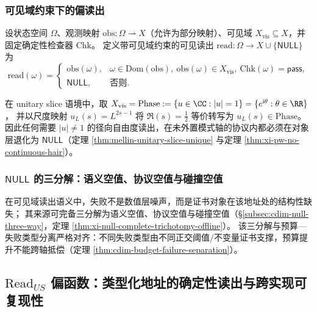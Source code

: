 \subsubsection{可见域约束下的偏读出}
\begin{definition}[可见域约束下的偏读出]\label{def:cdim-visible-domain-read}
设状态空间 \(\Omega\)、观测映射 \(\mathrm{obs}:\Omega\rightharpoonup X\)（允许为部分映射）、可见域 \(X_{\mathrm{vis}}\subseteq X\)，并固定确定性检查器 \(\mathrm{Chk}\)。
定义带可见域约束的可见读出 \(\mathrm{read}:\Omega\to X\cup\{\mathsf{NULL}\}\) 为
\[
\mathrm{read}(\omega)=
\begin{cases}
\mathrm{obs}(\omega), & \omega\in\mathrm{Dom}(\mathrm{obs}),\ \mathrm{obs}(\omega)\in X_{\mathrm{vis}},\ \mathrm{Chk}(\omega)=\mathsf{pass},\\
\mathsf{NULL}, & \text{否则}.
\end{cases}
\]
\end{definition}
在 unitary slice 语境中，取
\(
X_{\mathrm{vis}}=\mathrm{Phase}:=\{u\in\CC:|u|=1\}=\{e^{\mathrm{i}\theta}:\theta\in\RR\}
\)，
并以尺度映射 \(u_L(s)=L^{2s-1}\) 将 \(\Re(s)=\tfrac12\) 等价转写为 \(u_L(s)\in\mathrm{Phase}\)。
因此任何需要 \(|u|\neq 1\) 的径向自由度读出，在未外置模式轴的协议内都必须在对象层退化为 \(\mathsf{NULL}\)（定理 \ref{thm:mellin-unitary-slice-unique} 与定理 \ref{thm:xi-pw-no-continuous-hair}）。

\subsubsection{\texorpdfstring{$\mathsf{NULL}$}{NULL} 的三分解：语义空值、协议空值与碰撞空值}
在可见域读出语义中，失败不是数值层噪声，而是证书对象在该地址处的结构性缺失；
其来源可完备三分解为语义空值、协议空值与碰撞空值（\S\ref{subsec:cdim-null-three-way}，定理 \ref{thm:xi-null-complete-trichotomy-offline}）。
该三分解与预算—失败类型分离严格对齐：不同失败类型由不同正交阈值/不变量证书支撑，预算提升不能跨轴抵偿（定理 \ref{thm:cdim-budget-failure-separation}）。

\subsection{\texorpdfstring{$\mathrm{Read}_{US}$}{Read\_US} 偏函数：类型化地址的确定性读出与跨实现可复现性}\label{subsec:cdim-read-us-interface}
